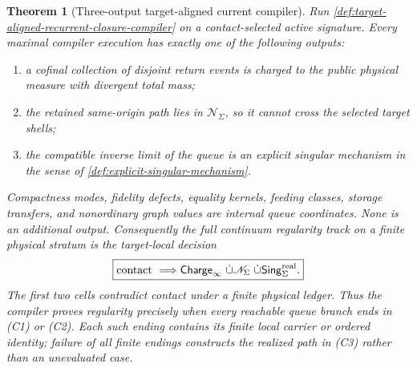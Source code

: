 \documentclass[11pt]{article}
\numberwithin{section}{part}
\theoremstyle{plain}
\newtheorem{theorem}{Theorem}[section]
\theoremstyle{definition}
\theoremstyle{remark}
\newcommand{\Null}{\mathscr N}
\begin{document}
\begin{theorem}[Three-output target-aligned current compiler]
\label{thm:three-output-target-aligned-current-compiler}
Run \cref{def:target-aligned-recurrent-closure-compiler} on a contact-selected
active signature.  Every maximal compiler execution has exactly one of the
following outputs:
\begin{enumerate}[label=\textup{(C\arabic*)}]
\item a cofinal collection of disjoint return events is charged to the public
physical measure with divergent total mass;
\item the retained same-origin path lies in \(\Null_\Sigma\), so it cannot
cross the selected target shells;
\item the compatible inverse limit of the queue is an explicit singular
mechanism in the sense of \cref{def:explicit-singular-mechanism}.
\end{enumerate}
Compactness modes, fidelity defects, equality kernels, feeding classes,
storage transfers, and nonordinary graph values are internal queue
coordinates.  None is an additional output.  Consequently the full
continuum regularity track on a finite physical stratum is the target-local
decision
\begin{equation}
 \label{eq:three-output-target-aligned-decision}
 \boxed{
 \text{contact}
 \ \Longrightarrow
 \mathsf{Charge}_{\infty}
 \ \dot\cup
 \Null_\Sigma
 \ \dot\cup
 \mathsf{Sing}^{\rm real}_\Sigma .}
\end{equation}
The first two cells contradict contact under a finite physical ledger.  Thus
the compiler proves regularity precisely when every reachable queue branch
ends in \textup{(C1)} or \textup{(C2)}.  Each such ending contains its finite
local carrier or ordered identity; failure of all finite endings constructs
the realized path in \textup{(C3)} rather than an unevaluated case.
\end{theorem}
\end{document}
